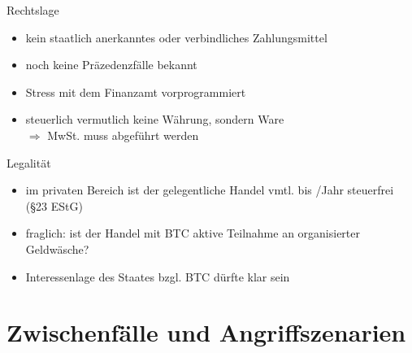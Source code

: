 \documentclass[handout]{beamer} \usepackage[german]{babel}
\begin{document}
%

\begin{frame}
	{Rechtslage}
	\begin{itemize}
		\item kein staatlich anerkanntes oder verbindliches Zahlungsmittel
		\item noch keine Präzedenzfälle bekannt
		\item Stress mit dem Finanzamt vorprogrammiert
		\item steuerlich vermutlich keine Währung, sondern Ware\\
			$\Rightarrow$ MwSt. muss abgeführt werden
	\end{itemize}
\end{frame}

\begin{frame}
	{Legalität}
	\begin{itemize}
		\item im privaten Bereich ist der gelegentliche Handel vmtl. bis /Jahr
			steuerfrei (§23 EStG)
		\item fraglich: ist der Handel mit BTC aktive Teilnahme an organisierter
			Geldwäsche?
		\item Interessenlage des Staates bzgl. BTC dürfte klar sein
	\end{itemize}
\end{frame}

\section{Zwischenfälle und Angriffszenarien}
\end{document}
